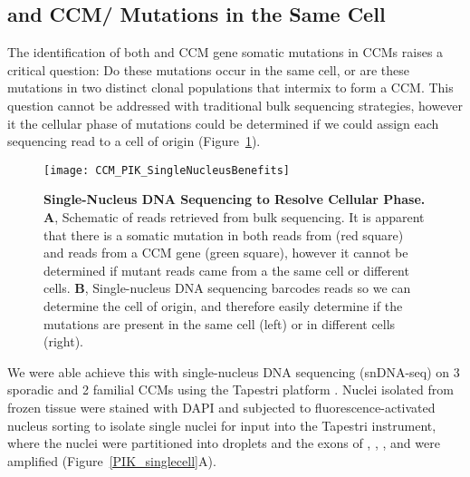\subsection{ and CCM/ Mutations in the Same Cell}
The identification of both  and CCM gene somatic mutations in CCMs raises a critical question: Do these mutations occur in the same cell, or are these mutations in two distinct clonal populations that intermix to form a CCM. This question cannot be addressed with traditional bulk sequencing strategies, however it the cellular phase of mutations could be determined if we could assign each sequencing read to a cell of origin (Figure~\ref{CCM_PIK_SingleNucleusBenefits}). 
\begin{figure}[tbp!]
\begin{center}
\texttt{[image: CCM\_PIK\_SingleNucleusBenefits]}
\end{center}
\caption[Single-Nucleus DNA Sequencing to Resolve Cellular Phase] {\textbf{Single-Nucleus DNA Sequencing to Resolve Cellular Phase.} \\ \textbf{A}, Schematic of reads retrieved from bulk sequencing. It is apparent that there is a somatic mutation in both reads from  (red square) and reads from a CCM gene (green square), however it cannot be determined if mutant reads came from a the same cell or different cells. \textbf{B}, Single-nucleus DNA sequencing barcodes reads so we can determine the cell of origin, and therefore easily determine if the mutations are present in the same cell (left) or in different cells (right).}

\label{CCM_PIK_SingleNucleusBenefits}
\end{figure}
We were able achieve this with single-nucleus DNA sequencing (snDNA-seq) on 3 sporadic and 2 familial CCMs using the Tapestri platform \citep{xu2019}. Nuclei isolated from frozen tissue were stained with DAPI and subjected to fluorescence-activated nucleus sorting to isolate single nuclei for input into the Tapestri instrument, where the nuclei were partitioned into droplets and the exons of , , , and  were amplified (Figure~\ref{PIK_singlecell}A). 

